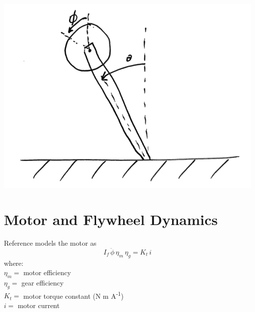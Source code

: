 \documentclass[12pt,letterpaper]{article}
\begin{document}
\includegraphics[width=\textwidth]{images/scan1.png}
    \label{modelOfPendulum}






\section{Motor and Flywheel Dynamics}

Reference \cite{reactionWheel} models the motor as 
%
\begin{equation}
    I_{f} \, \ddot{\phi} \, \eta_{m} \, \eta_{g}  = K_{t} \, i
\end{equation}
%
where: \\
$\eta_{m} =$ motor efficiency \\
$\eta_{g} =$ gear efficiency \\
$K_{t} =$ motor torque constant (N m A\textsuperscript{-1}) \\
$i =$ motor current \\
\end{document}
